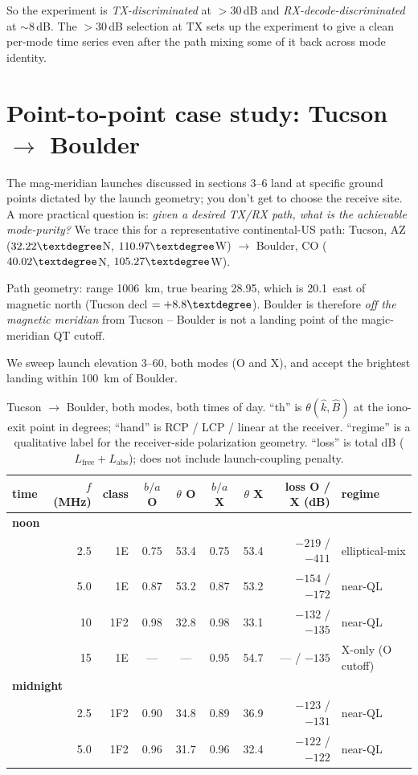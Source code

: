 \documentclass[11pt]{article}
\begin{document}
So the experiment is \emph{TX-discriminated} at $>30$\,dB and
\emph{RX-decode-discriminated} at $\sim 8$\,dB.  The $>30$\,dB
selection at TX sets up the experiment to give a clean per-mode time
series even after the path mixing some of it back across mode
identity.


\section{Point-to-point case study: Tucson $\to$ Boulder}
\label{sec:tucson_boulder}

The mag-meridian launches discussed in sections 3--6 land at specific
ground points dictated by the launch geometry; you don't get to
choose the receive site.  A more practical question is: \emph{given
a desired TX/RX path, what is the achievable mode-purity?}  We trace
this for a representative continental-US path: Tucson, AZ
($32.22\textdegree$N, $110.97\textdegree$W) $\to$ Boulder, CO
($40.02\textdegree$N, $105.27\textdegree$W).

Path geometry: range 1006~km, true bearing 28.95\textdegree, which is
20.1\textdegree\ east of magnetic north (Tucson decl
$=+8.8\textdegree$).  Boulder is therefore \emph{off the
magnetic meridian} from Tucson -- Boulder is not a landing point of
the magic-meridian QT cutoff.

We sweep launch elevation 3--60\textdegree, both modes (O and X),
and accept the brightest landing within 100~km of Boulder.

\begin{table}[H]
\centering
\caption{Tucson $\to$ Boulder, both modes, both times of day.  ``th''
is $\theta(\hat k,\hat B)$ at the iono-exit point in degrees;
``hand'' is RCP / LCP / linear at the receiver.  ``regime'' is a
qualitative label for the receiver-side polarization geometry.
``loss'' is total dB ($L_\text{free}+L_\text{abs}$); does not include
launch-coupling penalty.}
\begin{tabular}{lrrcccrrl}
\toprule
time & $f$ (MHz) & class & $b/a$ O & $\theta$ O & $b/a$ X & $\theta$ X & loss O / X (dB) & regime \\
\midrule
\multicolumn{9}{l}{\textbf{noon}} \\
& 2.5 & 1E   & 0.75 & 53.4 & 0.75 & 53.4 & $-219$ / $-411$ & elliptical-mix \\
& 5.0 & 1E   & 0.87 & 53.2 & 0.87 & 53.2 & $-154$ / $-172$ & near-QL \\
& 10  & 1F2  & 0.98 & 32.8 & 0.98 & 33.1 & $-132$ / $-135$ & near-QL \\
& 15  & 1E   & ---  & ---  & 0.95 & 54.7 & ---   / $-135$ & X-only (O cutoff) \\
\midrule
\multicolumn{9}{l}{\textbf{midnight}} \\
& 2.5 & 1F2  & 0.90 & 34.8 & 0.89 & 36.9 & $-123$ / $-131$ & near-QL \\
& 5.0 & 1F2  & 0.96 & 31.7 & 0.96 & 32.4 & $-122$ / $-122$ & near-QL \\
\bottomrule
\end{tabular}
\end{table}
\end{document}
